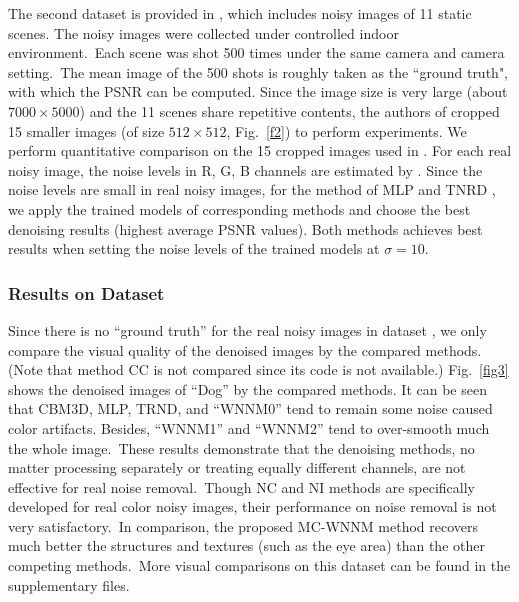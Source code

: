 \documentclass[10pt,twocolumn,letterpaper,sort&compress]{article}
\begin{document}
The second dataset is provided in \cite{crosschannel2016}, which includes noisy images of 11 static scenes. The noisy images were collected under controlled indoor environment.\ Each scene was shot 500 times under the same camera and camera setting.\ The mean image of the 500 shots is roughly taken as the ``ground truth", with which the PSNR can be computed. Since the image size is very large (about $7000\times5000$) and the 11 scenes share repetitive contents, the authors of \cite{crosschannel2016} cropped 15 smaller images (of size $512\times512$, Fig.\ \ref{f2}) to perform experiments. We perform quantitative comparison on the 15 cropped images used in \cite{crosschannel2016}. For each real noisy image, the noise levels in R, G, B channels are estimated by \cite{Chen2015ICCV}. Since the noise levels are small in real noisy images, for the method of MLP \cite{mlp} and TNRD \cite{chen2015learning}, we apply the trained models of corresponding methods and choose the best denoising results (highest average PSNR values). Both methods achieves best results when setting the noise levels of the trained models at $\sigma=10$. 

\subsubsection{Results on Dataset \cite{ncwebsite}}
Since there is no ``ground truth'' for the real noisy images in dataset \cite{ncwebsite}, we only compare the visual quality of the denoised images by the compared methods. (Note that method CC \cite{crosschannel2016} is not compared since its code is not available.) Fig.\ \ref{fig3} shows the denoised images of ``Dog'' by the compared methods. It can be seen that CBM3D, MLP, TRND, and ``WNNM0'' tend to remain some noise caused color artifacts. Besides, ``WNNM1'' and ``WNNM2'' tend to over-smooth much the whole image.\ These results demonstrate that the denoising methods, no matter processing separately or treating equally different channels, are not effective for real noise removal.\ Though NC and NI methods are specifically developed for real color noisy images, their performance on noise removal is not very satisfactory.\ In comparison, the proposed MC-WNNM method recovers much better the structures and textures (such as the eye area) than the other competing methods.\ More visual comparisons on this dataset \cite{ncwebsite} can be found in the supplementary files.
\end{document}
